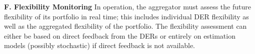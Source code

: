 \textbf{F. Flexibility Monitoring}
In operation, the aggregator must assess the future flexibility of its portfolio in real time; this includes individual DER flexibility as well as the aggregated flexibility of the portfolio. The flexibility assessment can either be based on direct feedback from the DERs or entirely on estimation models (possibly stochastic) if direct feedback is not available.